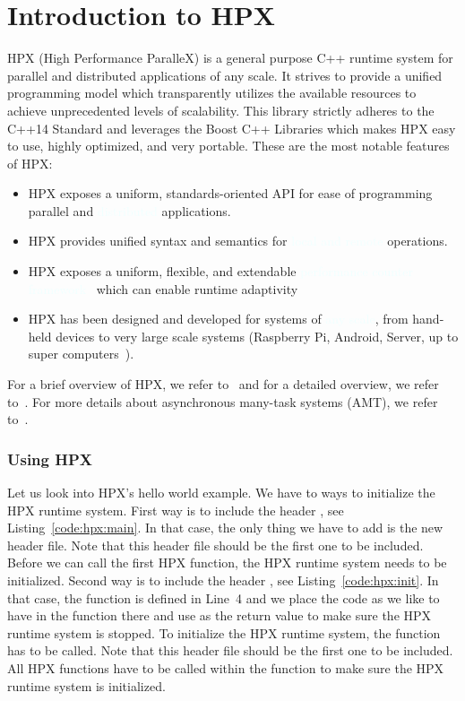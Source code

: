 \documentclass[11pt,fleqn]{book} %
\begin{document}
\chapter{Introduction to HPX}
HPX (High Performance ParalleX) is a general purpose C++ runtime system for parallel and distributed applications of any scale. It strives to provide a unified programming model which transparently utilizes the available resources to achieve unprecedented levels of scalability.  This library strictly adheres to the C++14 Standard and leverages the Boost C++ Libraries which makes HPX easy to use, highly optimized, and very portable. These are the most notable features of HPX:
\vspace{0.25cm}
\begin{itemize}
\item HPX exposes a uniform, standards-oriented API for ease of programming parallel and \textcolor{azure}{distributed} applications.
\item HPX provides unified syntax and semantics for \textcolor{azure}{local and remote} operations.
\item HPX exposes a uniform, flexible, and extendable \textcolor{azure}{performance counter framework}~\cite{grubel2016dynamic,grubel2016using} which can enable runtime adaptivity
\item HPX has been designed and developed for systems of \textcolor{azure}{any scale}, from hand-held devices to very large scale systems (Raspberry Pi, Android, Server, up to super computers~\cite{daiss2019piz,heller2019harnessing}).
\end{itemize}
\vspace{0.25cm}
For a brief overview of HPX, we refer to~\cite{heller2017hpx} and for a detailed overview, we refer to~\cite{heller2019extending}. For more details about asynchronous many-task systems (AMT), we refer to~\cite{thoman2018taxonomy}.

\subsection*{Using HPX}
Let us look into HPX's hello world example. We have to ways to initialize the HPX runtime system. First way is to include the header , see Listing~\ref{code:hpx:main}. In that case, the only thing we have to add is the new header file. Note that this header file should be the first one to be included. Before we can call the first HPX function, the HPX runtime system needs to be initialized. Second way is to include the header , see Listing~\ref{code:hpx:init}. In that case, the  function is defined in Line~4 and we place the code as we like to have in the  function there and use  as the return value to make sure the HPX runtime system is stopped. To initialize the HPX runtime system, the function  has to be called. Note that this header file should be the first one to be included. All HPX functions have to be called within the  function to make sure the HPX runtime system is initialized. \\
\end{document}
